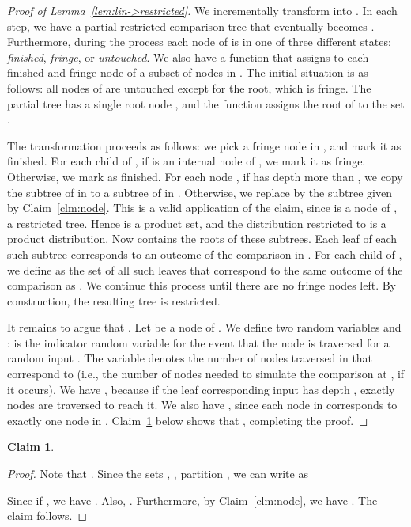 \documentclass[letterpaper,11pt]{article}
\newtheorem{claim}[theorem]{Claim}
\begin{document}
\begin{proof}[Proof of Lemma~\ref{lem:lin->restricted}]
We incrementally transform 
 into .
In each step, we have 
a partial restricted 
comparison tree  
that eventually becomes .
Furthermore, during the 
process each node of 
 is in one of 
three different states:
\emph{finished}, \emph{fringe}, 
or \emph{untouched}. 
We also have a function 
that assigns to each finished and 
fringe node of  a subset 
 of nodes in .
The initial situation is 
as follows: all nodes of  
are untouched except for the 
root, which is fringe. 
The partial tree 
 has a single 
root node , and the function
 assigns the root of  
to the set  .

The transformation proceeds as 
follows: we pick a fringe node 
 in , and mark it as finished.
For each child  of , if  
is an internal node of , we mark 
it as fringe. Otherwise, we mark 
 as finished.
For each node ,
if  has depth more than ,
we copy the subtree of  in
 to a subtree of  in
.
Otherwise, 
we replace   
by the subtree given 
by Claim~\ref{clm:node}.  This
is a valid application of the claim, 
since  is a node of , a 
restricted tree. 
Hence  is a 
product set, and the distribution
 restricted to  is 
a product distribution.
Now  contains the roots of 
these subtrees. Each leaf of each such
subtree corresponds to an outcome of 
the comparison in .  
For each child  of , we define 
 as the set of all such leaves 
that correspond to the same outcome 
of the comparison as . 
We continue this process until 
there are no fringe nodes left. 
By construction, the resulting 
tree  is restricted. 

It remains to argue that 
. 
Let  be a node of . 
We define two random variables 
 and :  is 
the indicator random variable 
for the event that the node
 is traversed for a random 
input .  
The variable  denotes 
the number of nodes traversed 
in  that correspond to  
(i.e., the number of nodes
needed to simulate the comparison 
at , if it occurs).
We have 
, 
because if the leaf corresponding
input  has depth , exactly 
 nodes are traversed to reach it.
We also have 
, 
since each node in  corresponds 
to exactly one node  in . 
Claim~\ref{clm:YvBound} below 
shows that , 
completing the proof.
\end{proof}

\begin{claim}\label{clm:YvBound} 
  
\end{claim}

\begin{proof}
Note that 
.
Since the sets , , 
partition , 
we can write  as

Since  if , 
we have . 
Also, . 
Furthermore, by Claim~\ref{clm:node}, 
we have .
The claim follows.
\end{proof}
\end{document}

